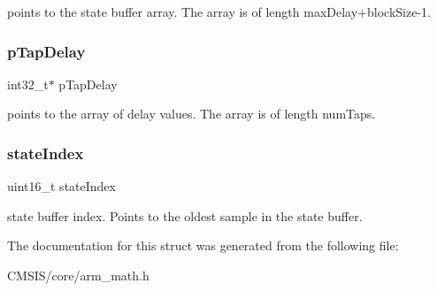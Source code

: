 points to the state buffer array. The array is of length max\+Delay+block\+Size-\/1. \mbox{\label{structarm__fir__sparse__instance__f32_adec00b3793ab4f08edfeb4ea6a9eb6e6}} 
\subsubsection{\texorpdfstring{p\+Tap\+Delay}{pTapDelay}}
{\footnotesize\ttfamily int32\+\_\+t$\ast$ p\+Tap\+Delay}

points to the array of delay values. The array is of length num\+Taps. \mbox{\label{structarm__fir__sparse__instance__f32_a566a0cb53437e48b9a3bf18e5b03d8aa}} 
\subsubsection{\texorpdfstring{state\+Index}{stateIndex}}
{\footnotesize\ttfamily uint16\+\_\+t state\+Index}

state buffer index. Points to the oldest sample in the state buffer. 

The documentation for this struct was generated from the following file\+:\begin{DoxyCompactItemize}
\item 
C\+M\+S\+I\+S/core/arm\+\_\+math.\+h\end{DoxyCompactItemize}
